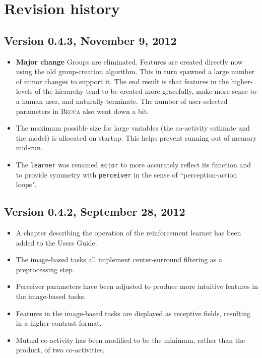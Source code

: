 \chapter{Revision history}

\section*{Version 0.4.3, November 9, 2012}

\begin{itemize}
\item {\bf Major change} Groups are eliminated. Features are created directly now using the old group-creation algorithm. This in turn spawned a large number of minor changes to support it. The end result is that features in the higher-levels of the hierarchy tend to be created more gracefully, make more sense to a human user, and naturally terminate. The number of user-selected parameters in \textsc{Becca} also went down a bit.
\item The maximum possible size for large variables (the co-activity estimate and the model) is allocated on startup. This helps prevent running out of memory mid-run.
\item The \texttt{learner} was renamed \texttt{actor} to more accurately reflect its function and to provide symmetry with \texttt{perceiver} in the sense of ``perception-action loops". 
\end{itemize}

\section*{Version 0.4.2, September 28, 2012}

\begin{itemize}
\item A chapter describing the operation of the reinforcement learner has been added to the Users Guide.
\item The image-based tasks all implement center-surround filtering as a preprocessing step.
\item Perceiver parameters have been adjusted to produce more intuitive features in the image-based tasks.
\item Features in the image-based tasks are displayed as receptive fields, resulting in a higher-contrast format.
\item Mutual co-activity has been modified to be the minimum, rather than the product, of two co-activities.
\end{itemize}


